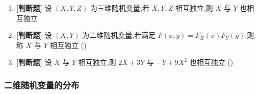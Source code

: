 \begin{enumerate}
    \item \textbf{[判断题]} 设 $(X,Y,Z)$ 为三维随机变量,若 $X,Y,Z$ 相互独立,则 $X$ 与 $Y$ 也相互独立

    \item \textbf{[判断题]} 设 $(X,Y)$ 为二维随机变量,若满足 $F(x,y)=F_X(x)F_Y(y)$,则称 $X$ 与 $Y$ 相互独立 (\quad)

    \item \textbf{[判断题]} 设 $X$ 与 $Y$ 相互独立,则 $2X+3Y$ 与 $-Y+9X^2$ 也相互独立 (\quad)
\end{enumerate}

\subsubsection{二维随机变量的分布}

